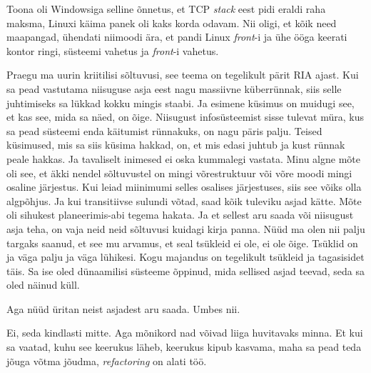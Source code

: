Toona oli Windowsiga selline õnnetus, et TCP \emph{stack} eest 
pidi eraldi raha maksma, Linuxi käima panek oli kaks korda odavam. Nii oligi, et 
kõik need maapangad, ühendati niimoodi ära, et pandi Linux \emph{front}-i ja 
ühe ööga keerati kontor ringi, süsteemi vahetus ja  \emph{front}-i vahetus. 


Praegu ma uurin kriitilisi sõltuvusi, see teema on tegelikult pärit 
RIA ajast. 
Kui sa pead vastutama niisuguse asja eest nagu massiivne küberrünnak, siis 
selle juhtimiseks sa lükkad kokku mingis staabi. Ja esimene küsimus on muidugi 
see, et kas see, mida sa näed, on õige. Niisugust  infosüsteemist 
sisse tulevat müra, kus  sa pead süsteemi enda käitumist rünnakuks, on nagu 
päris palju.  Teised küsimused, mis sa siis küsima hakkad, on, et mis edasi 
juhtub ja kust rünnak peale hakkas. Ja tavaliselt  inimesed ei oska  kummalegi vastata. Minu algne mõte oli see, et äkki nendel sõltuvustel on mingi 
võrestruktuur või võre moodi mingi osaline järjestus. Kui leiad  miinimumi  
selles osalises järjestuses, siis see võiks olla algpõhjus. Ja kui transitiivse 
sulundi võtad, saad kõik tuleviku asjad kätte. Mõte oli sihukest planeerimis-abi 
tegema hakata. Ja et sellest aru saada või niisugust asja teha, on vaja 
neid neid sõltuvusi kuidagi kirja panna. Nüüd ma olen nii palju targaks saanud, 
et see mu arvamus, et seal tsükleid ei ole, ei ole õige. Tsüklid on ja väga 
palju ja väga lühikesi. Kogu majandus on tegelikult tsükleid ja tagasisidet 
täis.  Sa ise oled dünaamilisi süsteeme õppinud, mida sellised asjad teevad, 
seda sa oled näinud küll.

Aga nüüd üritan neist asjadest aru saada. Umbes nii.
           
                       
Ei, seda kindlasti mitte. Aga mõnikord nad võivad liiga huvitavaks minna. Et 
kui sa vaatad, kuhu see keerukus läheb, keerukus kipub kasvama, maha sa pead 
teda jõuga võtma jõudma, \emph{refactoring} on alati töö.
